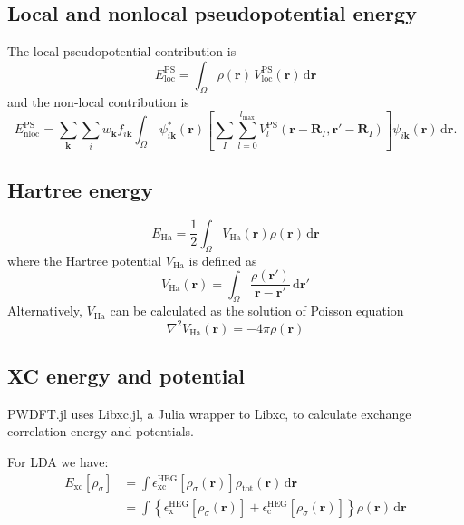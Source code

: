 \subsection{Local and nonlocal pseudopotential energy}

The local pseudopotential contribution is
\begin{equation}
E^{\mathrm{PS}}_{\mathrm{loc}} =
\int_{\Omega} \rho(\mathbf{r})\,V^{\mathrm{PS}}_{\mathrm{loc}}(\mathbf{r})\,
\mathrm{d}\mathbf{r}
\end{equation}
%
and the non-local contribution is
\begin{equation}
E^{\mathrm{PS}}_{\mathrm{nloc}} = 
\sum_{\mathbf{k}}
\sum_{i}
w_{\mathbf{k}}
f_{i\mathbf{k}}
\int_{\Omega}\,
\psi^{*}_{i\mathbf{k}}(\mathbf{r})
\left[
\sum_{I}\sum_{l=0}^{l_{\mathrm{max}}}
V^{\mathrm{PS}}_{l}(\mathbf{r}-\mathbf{R}_{I},\mathbf{r}'-\mathbf{R}_{I})
\right]
\psi_{i\mathbf{k}}(\mathbf{r})
\,\mathrm{d}\mathbf{r}.
\end{equation}

\subsection{Hartree energy}

\begin{equation}
E_{\mathrm{Ha}} = \frac{1}{2}
\int_{\Omega}
V_{\mathrm{Ha}}(\mathbf{r})\rho(\mathbf{r})\,
\mathrm{d}\mathbf{r}
\end{equation}
where the Hartree potential $V_{\mathrm{Ha}}$ is defined as
\begin{equation}
V_{\mathrm{Ha}}(\mathbf{r}) =
\int_{\Omega}
\frac{\rho(\mathbf{r}')}{\mathbf{r} - \mathbf{r}'}
\,\mathrm{d}\mathbf{r}'
\end{equation}
Alternatively, $V_{\mathrm{Ha}}$ can be calculated as the solution of Poisson
equation
\begin{equation}
\nabla^2 V_{\mathrm{Ha}}(\mathbf{r}) =
-4\pi\rho(\mathbf{r})
\end{equation}

\subsection{XC energy and potential}

\textsf{PWDFT.jl} uses \textsf{Libxc.jl}\cite{Libxc.jl}, a Julia wrapper to
\textsf{Libxc}\cite{Marques2012,Lehtola2018}, to calculate exchange correlation
energy and potentials.

For LDA we have:
\begin{align}
E_{\mathrm{xc}}\left[\rho_{\sigma}\right] & = \int \epsilon^{\mathrm{HEG}}_{\mathrm{xc}}
\left[ \rho_{\sigma}(\mathbf{r}) \right]
\rho_{\text{tot}}(\mathbf{r})\, \mathrm{d}\mathbf{r} \\
& = \int \left\{
\epsilon^{\mathrm{HEG}}_{\mathrm{x}} \left[ \rho_{\sigma}(\mathbf{r}) \right] +
\epsilon^{\mathrm{HEG}}_{\mathrm{c}} \left[ \rho_{\sigma}(\mathbf{r}) \right]
\right\}
\rho(\mathbf{r})\, \mathrm{d}\mathbf{r}
\end{align}

